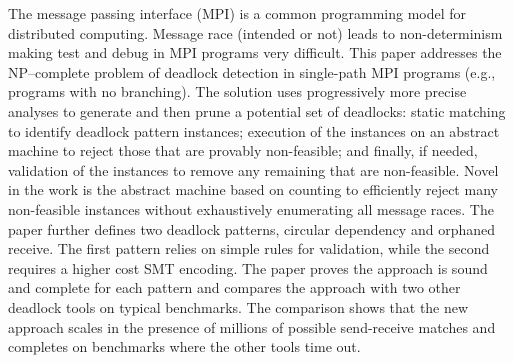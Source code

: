 The message passing interface (MPI) is a common programming model for distributed computing. Message race (intended or not) leads to non-determinism making test and debug in MPI programs very difficult. This paper addresses the NP--complete problem of deadlock detection in single-path MPI programs (e.g., programs with no branching). The solution uses progressively more precise analyses to generate and then prune a potential set of deadlocks: static matching to identify deadlock pattern instances; execution of the instances on an abstract machine to reject those that are provably non-feasible; and finally, if needed, validation of the instances to remove any remaining that are non-feasible. Novel in the work is the abstract machine based on counting to efficiently reject many non-feasible instances without exhaustively enumerating all message races.  The paper further defines two deadlock patterns, circular dependency and orphaned receive. The first pattern relies on simple rules for validation, while the second requires a higher cost SMT encoding. The paper proves the approach is sound and complete for each pattern and compares the approach with two other deadlock tools on typical benchmarks. The comparison shows that the new approach scales in the presence of millions of possible send-receive matches and completes on benchmarks where the other tools time out.
